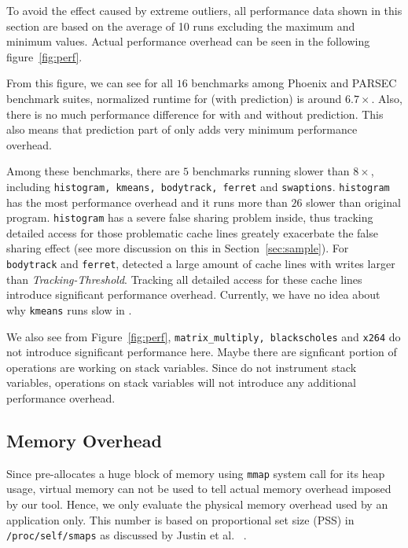To avoid the effect caused by extreme outliers, all performance data shown in this section
are based on the average of 10 runs excluding the maximum and minimum values.
Actual performance overhead can be seen in the following figure~\ref{fig:perf}. 

From this figure, we can see for all $16$ benchmarks among Phoenix and PARSEC
benchmark suites, normalized runtime for \Predator{} (with prediction) is around $6.7\times$.
Also, there is no much performance difference for \Predator{} with and without prediction. 
This also means that prediction part of \Predator{} only adds very minimum performance overhead. 

Among these benchmarks, there are $5$ benchmarks running slower than $8\times$, 
including \texttt{histogram, kmeans, bodytrack, ferret} and \texttt{swaptions}. 
\texttt{histogram} has the most performance overhead and it runs more than $26$ slower than original 
program. 
\texttt{histogram} has a severe false sharing problem inside, thus tracking detailed access for those
problematic cache lines greately exacerbate the false sharing effect (see more discussion on this in Section~\ref{sec:sample}). 
For \texttt{bodytrack} and \texttt{ferret}, \Predator{} detected a large amount of cache lines with 
writes larger than {\it Tracking-Threshold}. Tracking all detailed access for these cache lines 
introduce significant performance overhead. 
Currently, we have no idea about why \texttt{kmeans} runs slow in \Predator{}. 

We also see from Figure~\ref{fig:perf}, \texttt{matrix\_multiply, blackscholes} and \texttt{x264} do not
introduce significant performance here. Maybe there are signficant portion of operations 
are working on stack variables. 
Since \Predator{} do not instrument stack variables, 
operations on stack variables will not introduce any
additional performance overhead. 

\subsection{Memory Overhead}
\label{sec:memoverhead}
Since \Predator{} pre-allocates a huge block of memory using \texttt{mmap} system call for 
its heap usage, 
virtual memory can not be used to tell actual memory overhead imposed by our tool. 
Hence, we only evaluate the physical memory overhead used by an application only. 
This number is based on proportional set size (PSS) in \texttt{/proc/self/smaps}
as discussed by Justin et al. ~\cite{memusage}. 

